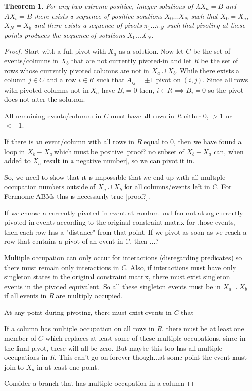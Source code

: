 \documentclass{article}
\newtheorem{theorem}{Theorem}
\begin{document}
\begin{theorem}
For any two extreme positive, integer solutions of $AX_a = B$ and $AX_b = B$ there exists a sequence of positive solutions $X_0...X_N$ such that $X_0 = X_a$, $X_N = X_b$ and there exists a sequence of pivots $\pi_1...\pi_N$ such that pivoting at these points produces the sequence of solutions $X_0...X_N$.
\end{theorem}

\begin{proof}
Start with a full pivot with $X_a$ as a solution. Now let $C$ be the set of events/columns in $X_b$ that are not currently pivoted-in and let $R$ be the set of rows whose currently pivoted columns are not in $X_a \cup X_b$. While there exists a column $j \in C$ and a row $i \in R$ such that $A_{ij} = \pm 1$ pivot on $(i,j)$. Since all rows with pivoted columns not in $X_a$ have $B_i = 0$ then, $i \in R \implies B_i = 0$ so the pivot does not alter the solution.

All remaining events/columns in $C$ must have all rows in $R$ either $0$, $>1$ or $<-1$.

If there is an event/column with all rows in $R$ equal to $0$, then we have found a loop in $X_b-X_a$ which must be positive [proof? no subset of $X_b - X_a$ can, when added to $X_a$ result in a negative number], so we can pivot it in.

So, we need to show that it is impossible that we end up with all multiple occupation numbers outside of $X_a \cup X_b$ for all columns/events left in $C$. For Fermionic ABMs this is necessarily true [proof?].

If we choose a currently pivoted-in event at random and fan out along currently pivoted-in events according to the original constraint matrix for those events, then each row has a "distance" from that point. If we pivot as soon as we reach a row that contains a pivot of an event in $C$, then ...? 

Multiple occupation can only occur for interactions (disregarding predicates) so there must remain only interactions in $C$. Also, if interactions must have only singleton states in the original constraint matrix, there must exist singleton events in the pivoted equivalent. So all these singleton events must be in $X_a \cup X_b$ if all events in $R$ are multiply occupied.

At any point during pivoting, there must exist events in $C$ that 

If a column has multiple occupation on all rows in $R$, there must be at least one member of $C$ which replaces at least some of these multiple occupations, since in the final pivot, these will all be zero. But maybe this too has all multiple occupations in $R$. This can't go on forever though...at some point the event must join to $X_a$ in at least one point.

Consider a branch that has multiple occupation in a column

\end{proof}
\end{document}
